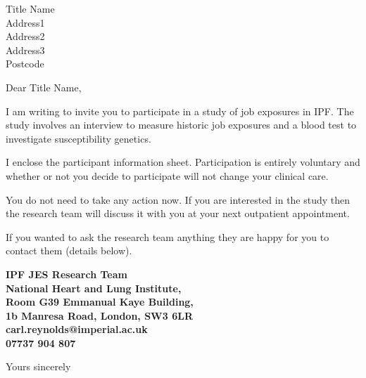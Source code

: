 \documentclass[ipfjes-centre,letterpaper,pagesize,UScommercial9]{scrlttr2}
\begin{document}
\begin{letter}{Title Name \\ Address1 \\ Address2 \\ Address3 \\ Postcode}


\opening{Dear Title Name,}

     I am writing to invite you to participate in a study of job exposures in IPF. The study involves an interview to measure historic job exposures and a blood test to investigate susceptibility genetics. 
     
    I enclose the participant information sheet. Participation is entirely voluntary and whether or not you decide to participate will not change your clinical care. 
    
    You do not need to take any action now. If you are interested in the study then the research team will discuss it with you at your next outpatient appointment.

    If you wanted to ask the research team anything they are happy for you to contact them (details below).

    \vspace{1cm}
    \begin{centering}
    \textbf{
    IPF JES Research Team \\  
    National Heart and Lung Institute, \\
    Room G39 Emmanual Kaye Building, \\
    1b Manresa Road, London, SW3 6LR\\
    carl.reynolds@imperial.ac.uk \\
    07737 904 807 \\
    }
    \end{centering}
    \vspace{1cm}

\closing{Yours sincerely}


\end{letter}
\end{document}
